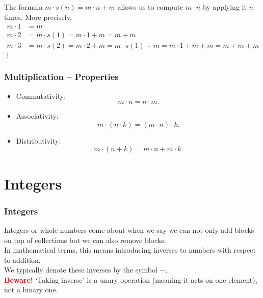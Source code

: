 \documentclass[aspectratio=169,11pt,usenames,dvipsnames]{beamer}
\begin{document}
\begin{frame}
\begin{figure}[ht]
\begin{subfigure}[b]{.25\textwidth}
  \end{subfigure}
 \end{figure}
 \pause
 The formula $m \cdot s(n) = m \cdot n + m$ allows us to compute $m \cdot n$ by
 applying it $n$ times.
 \pause
 More precisely,
 \begin{align*}
  m \cdot 1 &= m\\
  m \cdot 2 &= m \cdot s(1) = m \cdot 1 + m = m + m\\
  m \cdot 3 &= m \cdot s(2) = m \cdot 2 + m = m \cdot s(1) + m = m \cdot 1 + m +
  m = m + m + m\\
  \vdots&
 \end{align*}
\end{frame}

\begin{frame}
 \frametitle{Multiplication -- Properties}
 \begin{itemize}
  \item \alert{Commutativity}:
  \[
   m \cdot n = n \cdot m.
  \]
 \pause
 \item \alert{Associativity}:
  \[
   m \cdot (n \cdot k) = (m \cdot n) \cdot k.
  \]
 \pause
 \item \alert{Distributivity}:
  \[
   m \cdot (n + k) = m \cdot n + m \cdot k.
  \]
 \end{itemize}
\end{frame}

\section{Integers}

\begin{frame}
 \frametitle{Integers}
 \alert{Integers} or \alert{whole numbers} come about when we say we can not
 only add blocks on top of collections but we can also \alert{remove}
 blocks.\pause\\
 In mathematical terms, this means introducing \alert{inverses} to numbers
 \alert{with respect to addition}.\pause\\
 We typically denote these inverses by the symbol $-$.\pause\\
 \textcolor{Red}{\textbf{Beware!}} `Taking inverse' is a \alert{unary} operation
 (meaning it acts on \alert{one} element), not a binary one.
\end{frame}
\end{document}
